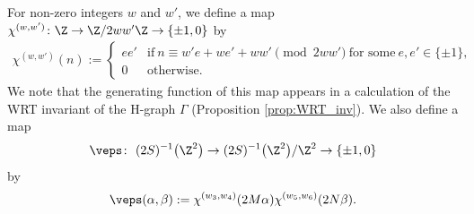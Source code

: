 For non-zero integers $ w $ and $ w' $, we define a map $ \chi^{(w, w')} \colon \Z \to \Z/2ww'\Z \to \{ \pm1, 0 \} $ by
\begin{gather*}
\chi^{(w, w')}(n) :=
\begin{cases}
	ee' & \text{if} \ n \equiv w'e + we' +ww' \pmod{2ww'} \ \text{for some}\ e, e' \in \{ \pm 1 \},
\\
	0 & \text{otherwise}.
\end{cases}
\end{gather*}
We note that the generating function of this map appears in a calculation of the WRT invariant of the H-graph $ \Gamma $ (Proposition \ref{prop:WRT_inv}).
We also define a map
\[
\veps \colon \ (2S)^{-1}\big(\Z^2\big) \to (2S)^{-1}\big(\Z^2\big)/\Z^2 \to \{ \pm1, 0 \}
\]
 by
\[
 \veps(\alpha, \beta) := \chi^{(w_3, w_4)}(2M\alpha) \chi^{(w_5, w_6)}(2N\beta) .
 \]

